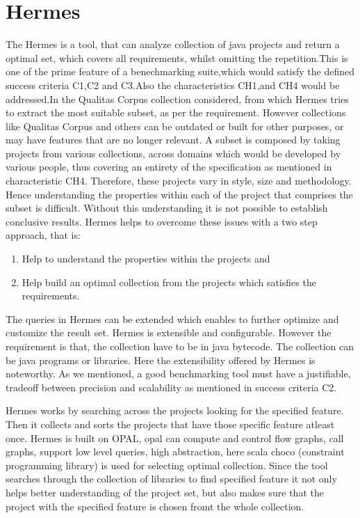 \documentclass[authoryear,preprint]{sigplanconf}
\begin{document}
\section{Hermes}
\label{sec:sec_hermes}
The Hermes\cite{Reif:2017:HAC:3088515.3088523} is a tool, that can analyze collection of java projects and return a optimal set, which covers all requirements, whilst omitting the repetition.This is one of the prime feature of a benechmarking suite,which would satisfy the defined success criteria C1,C2 and C3.Also the characteristics CH1,and CH4 would be addressed.In the Qualitas Corpus\cite{5693210} \cite{Dingsoyr:2013:RCL:2507288.2507322} collection considered, from which Hermes tries to extract the most suitable subset, as per the requirement. However collections like Qualitas Corpus and others can be outdated or built for other purposes, or may have features that are no longer relevant. A subset is composed by taking projects from various collections, across domains which would be developed by various people, thus covering an entirety of the specification as mentioned in characteristic CH4.  Therefore, these projects vary in style, size and methodology. Hence understanding the properties within each of the project that comprises the subset is difficult. Without this understanding it is not possible to establish conclusive results. Hermes helps to overcome these issues with a two step approach, that is:

\begin{enumerate}
	\item Help to understand the properties within the projects and 
	\item Help build an optimal collection from the projects which satisfies the requirements.
\end{enumerate}

The queries in Hermes can be extended which enables to further optimize and customize the result set. Hermes is extensible and configurable. However the requirement is that, the collection have to be in java bytecode. The collection can be java programs or libraries. Here the extensibility offered by Hermes is noteworthy. As we mentioned, a good benchmarking tool must have a justifiable, tradeoff between precision and scalability as mentioned in success criteria C2. 

Hermes works by searching across the projects looking for the specified feature. Then it collects and sorts the projects that have those specific feature atleast once. Hermes is built on OPAL, opal can compute and control flow graphs, call graphs, support low level queries, high abstraction, here scala choco (constraint programming library) is used for selecting optimal collection. Since the tool searches through the collection of libraries to find specified feature it not only helps better understanding of the project set, but also makes sure that the project with the specified feature is chosen fromt the whole collection.
\end{document}
